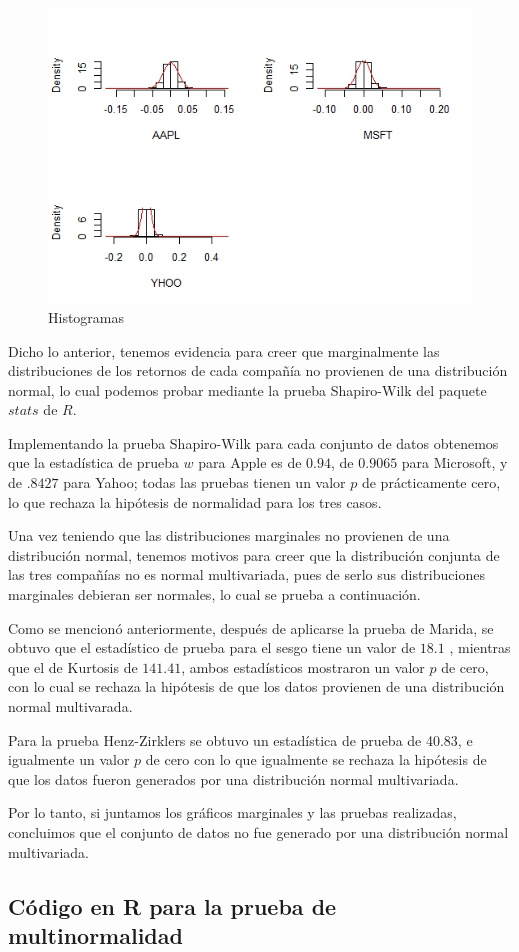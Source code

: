  \begin{figure}[h]
 	\centering
 	\includegraphics[width=1\linewidth]{Figuras/histmarg}
 	\caption{Histogramas}
 	\label{fig:histmarg}
 \end{figure}

Dicho lo anterior, tenemos evidencia para creer que marginalmente las distribuciones de los retornos de cada compañía no provienen de una distribución normal, lo cual podemos probar mediante la prueba Shapiro-Wilk del paquete $stats$ de $R$.

Implementando la prueba Shapiro-Wilk para cada conjunto de datos obtenemos que la estadística de prueba $w$ para Apple es de $0.94$, de $0.9065$ para Microsoft, y de $.8427$ para Yahoo; todas las pruebas tienen un valor $p$ de prácticamente cero, lo que rechaza la hipótesis de normalidad para los tres casos.

Una vez teniendo que las distribuciones marginales no provienen de una distribución normal, tenemos motivos para creer que la distribución conjunta de las tres compañías no es normal multivariada, pues de serlo sus distribuciones marginales debieran ser normales, lo cual se prueba a continuación.


Como se mencionó anteriormente, después de aplicarse la prueba de Marida, se obtuvo que el estadístico de prueba para el sesgo tiene un valor de $18.1$ , mientras que el de Kurtosis de $141.41$, ambos estadísticos mostraron un valor $p$ de cero, con lo cual se rechaza la hipótesis de que los datos provienen de una distribución normal multivarada.

Para la prueba Henz-Zirklers se obtuvo un estadística de prueba de 40.83, e igualmente un valor $p$ de cero con lo que igualmente se rechaza la hipótesis de que los datos fueron generados por una distribución normal multivariada. 

Por lo tanto, si juntamos los gráficos marginales y las pruebas realizadas, concluimos que el conjunto de datos no fue generado por una distribución normal multivariada.


\subsection{Código en R para la prueba de multinormalidad}



    